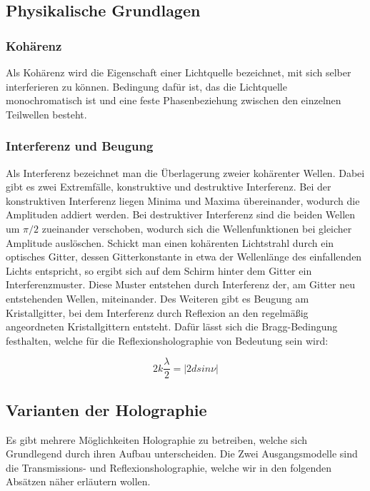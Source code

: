 \documentclass[12pt,a4paper]{article}
\begin{document}
\subsection{Physikalische Grundlagen}

\subsubsection{Kohärenz}

Als Kohärenz wird die Eigenschaft einer Lichtquelle bezeichnet, mit sich selber interferieren zu können. Bedingung dafür ist, das die Lichtquelle monochromatisch ist und eine feste Phasenbeziehung zwischen den einzelnen Teilwellen besteht.

\subsubsection{Interferenz und Beugung}

Als Interferenz bezeichnet man die Überlagerung zweier kohärenter Wellen. Dabei gibt es zwei Extremfälle, konstruktive und destruktive Interferenz. Bei der konstruktiven Interferenz liegen Minima und Maxima übereinander, wodurch die Amplituden addiert werden. Bei destruktiver Interferenz sind die beiden Wellen um $\pi/2$ zueinander verschoben, wodurch sich die Wellenfunktionen bei gleicher Amplitude auslöschen. Schickt man einen kohärenten Lichtstrahl durch ein optisches Gitter, dessen Gitterkonstante in etwa der Wellenlänge des einfallenden Lichts entspricht, so ergibt sich auf dem Schirm hinter dem Gitter ein Interferenzmuster. Diese Muster entstehen durch Interferenz der, am Gitter neu entstehenden Wellen, miteinander. Des Weiteren gibt es Beugung am Kristallgitter, bei dem Interferenz durch Reflexion an den regelmäßig angeordneten Kristallgittern entsteht. Dafür lässt sich die Bragg-Bedingung festhalten, welche für die Reflexionsholographie von Bedeutung sein wird:

\begin{equation}
2k \frac{\lambda}{2} = |2d sin \nu|
\label {1}
\end{equation}
	
\subsection{Varianten der Holographie}

Es gibt mehrere Möglichkeiten Holographie zu betreiben, welche sich Grundlegend durch ihren Aufbau unterscheiden. Die Zwei Ausgangsmodelle sind die Transmissions- und Reflexionsholographie, welche wir in den folgenden Absätzen näher erläutern wollen. 
\end{document}
